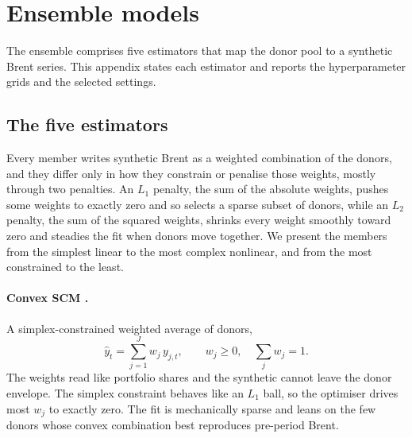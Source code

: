 
\section{Ensemble models}\label{app:ensemble}
The ensemble comprises five estimators that map the donor pool to a synthetic Brent series.
This appendix states each estimator and reports the hyperparameter grids and the selected
settings.

\subsection{The five estimators}\label{app:formulas}
Every member writes synthetic Brent as a weighted combination of the donors, and they differ
only in how they constrain or penalise those weights, mostly through two penalties. An $L_1$
penalty, the sum of the absolute weights, pushes some weights to exactly zero and so selects a
sparse subset of donors, while an $L_2$ penalty, the sum of the squared weights, shrinks every
weight smoothly toward zero and steadies the fit when donors move together. We present the members from the simplest linear to the most complex nonlinear, and from the most constrained to the least.

\paragraph{Convex SCM \citep{abadie2010}.} A simplex-constrained weighted average of donors,
\begin{equation}
\hat y_t = \sum_{j=1}^{J} w_j\, y_{j,t}, \qquad w_j \ge 0, \quad \sum_j w_j = 1 .
\label{eq:convex}
\end{equation}
The weights read like portfolio shares and the synthetic cannot leave the donor envelope. The
simplex constraint behaves like an $L_1$ ball, so the optimiser drives most $w_j$ to exactly
zero. The fit is mechanically sparse and leans on the few donors whose convex combination best
reproduces pre-period Brent.

